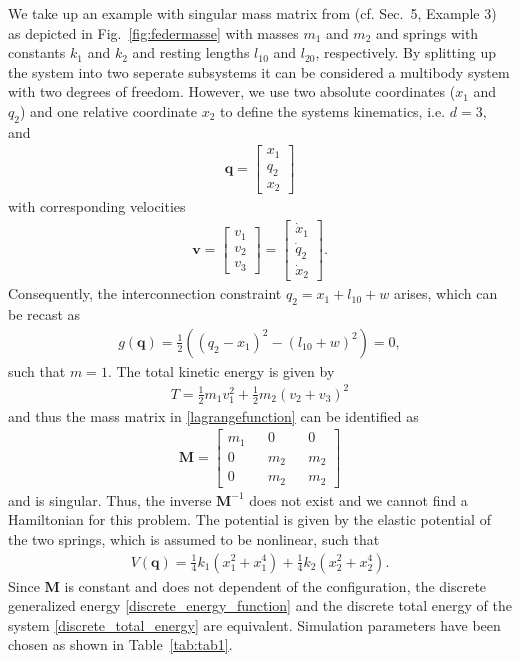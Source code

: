 \documentclass{multibody2023_full_paper}
\newcommand{\inv}{^{-1}}
\renewcommand{\vec}[1]{\ensuremath{\mbox{$\mathbf{#1}$}}}
\begin{document}
We take up an example with singular mass matrix from \cite{udwadia06} (cf. Sec.~5, Example 3) as depicted in Fig.~\ref{fig:federmasse} with masses $m_1$ and $m_2$ and springs with constants $k_1$ and $k_2$ and resting lengths $l_{10}$ and $l_{20}$, respectively. By splitting up the system into two seperate subsystems it can be considered a multibody system with two degrees of freedom. However, we use two absolute coordinates ($x_1$ and $q_2$) and one relative coordinate $x_2$ to define the systems kinematics, i.e. $d=3$, and
\begin{align}
    \vec{q}= \begin{bmatrix}
                 x_1 \\ q_2 \\ x_2
             \end{bmatrix}
\end{align}
with corresponding velocities
\begin{align}
    \vec{v} = \begin{bmatrix}
                  v_1 \\ v_2 \\ v_3
              \end{bmatrix} = \begin{bmatrix}
                                  \dot{x}_1 \\ \dot{q}_2 \\ \dot{x}_2
                              \end{bmatrix}.
\end{align}
Consequently, the interconnection constraint $ q_2 = x_1 + l_{10} + w $ arises, which can be recast as
\begin{align}
    g(\vec{q}) = \frac{1}{2} \left( (q_2 -x_1)^2 - (l_{10}+w)^2 \right) = 0 , \label{mass_spring_constraint}
\end{align}
such that $m=1$. The total kinetic energy is given by
\begin{align}
    T = \frac{1}{2} m_1 v_1^2 + \frac{1}{2} m_2 (v_2 + v_3)^2
\end{align}
and thus the mass matrix in \eqref{lagrangefunction} can be identified as
\begin{align}
    \vec{M} = \begin{bmatrix}
                  m_1 &  & 0   &  & 0   \\
                  0   &  & m_2 &  & m_2 \\
                  0   &  & m_2 &  & m_2
              \end{bmatrix}
\end{align}
and is singular. Thus, the inverse $\vec{M}\inv$ does not exist and we cannot find a Hamiltonian for this problem.
The potential is given by the elastic potential of the two springs, which is assumed to be nonlinear, such that
\begin{align}
    V(\vec{q}) = \frac{1}{4} k_1 (x_1^2 + x_1^4) +  \frac{1}{4} k_2 (x_2^2 + x_2^4) .
\end{align}
Since $\vec{M}$ is constant and does not dependent of the configuration,  the discrete generalized energy \eqref{discrete_energy_function} and the discrete total energy of the system \eqref{discrete_total_energy} are equivalent. Simulation parameters have been chosen as shown in Table~\ref{tab:tab1}.
\end{document}

